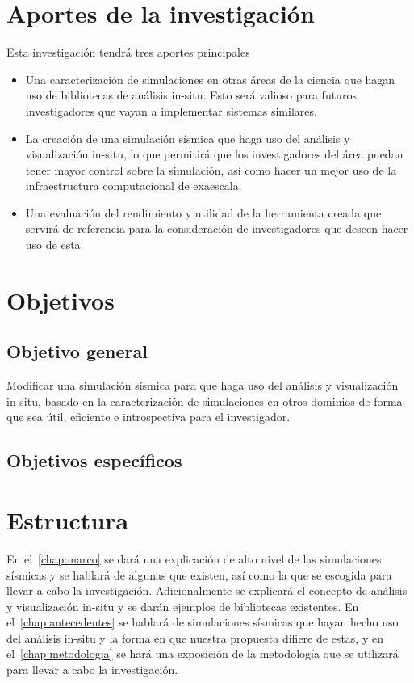 \section{Aportes de la investigación}
Esta investigación tendrá tres aportes principales
\begin{itemize}
  \item Una caracterización de simulaciones en otras áreas de la ciencia que hagan uso de bibliotecas de análisis in-situ. Esto será valioso para futuros investigadores que vayan a implementar sistemas similares. 
  \item La creación de una simulación sísmica que haga uso del análisis y visualización in-situ, lo que permitirá que los investigadores del área puedan tener mayor control sobre la simulación, así como hacer un mejor uso de la infraestructura computacional de exaescala. 
  \item Una evaluación del rendimiento y utilidad de la herramienta creada que servirá de referencia para la consideración de investigadores que deseen hacer uso de esta. 
  
\end{itemize}

\section{Objetivos}
\subsection{Objetivo general}
Modificar una simulación sísmica para que haga uso del análisis y visualización in-situ, basado en la caracterización de simulaciones en otros dominios de forma que sea útil, eficiente e introspectiva para el investigador.
\subsection{Objetivos específicos}

\section{Estructura}
En el~\cref{chap:marco} se dará una explicación de alto nivel de las simulaciones sísmicas y se hablará de algunas que existen, así como la que se escogida para llevar a cabo la investigación. Adicionalmente se explicará el concepto de análisis y visualización in-situ y se darán ejemplos de bibliotecas existentes.
En el~\cref{chap:antecedentes} se hablará de simulaciones sísmicas que hayan hecho uso del análisis in-situ y la forma en que nuestra propuesta difiere de estas, y en el~\cref{chap:metodologia} se hará una exposición de la metodología que se utilizará para llevar a cabo la investigación.


